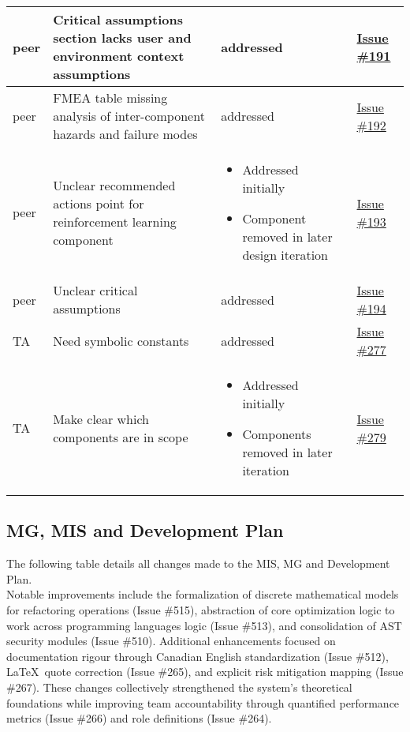 \documentclass{article}
\begin{document}
\begin{longtable}{|p{2cm}|p{3.5cm}|p{4.5cm}|p{3cm}|}
peer & Critical assumptions section lacks user and environment context assumptions & addressed & \href{https://github.com/ssm-lab/capstone--source-code-optimizer/issues/191}{Issue \#191} \\
\hline

peer & FMEA table missing analysis of inter-component hazards and failure modes & addressed & \href{https://github.com/ssm-lab/capstone--source-code-optimizer/issues/192}{Issue \#192} \\
\hline

peer & Unclear recommended actions point for reinforcement learning component & \begin{itemize}[nosep,leftmargin=*]
    \item Addressed initially
    \item Component removed in later design iteration
\end{itemize} & \href{https://github.com/ssm-lab/capstone--source-code-optimizer/issues/193}{Issue \#193} \\
\hline

peer & Unclear critical assumptions & addressed & \href{https://github.com/ssm-lab/capstone--source-code-optimizer/issues/194}{Issue \#194} \\
\hline

TA & Need symbolic constants & addressed & \href{https://github.com/ssm-lab/capstone--source-code-optimizer/issues/277}{Issue \#277} \\
\hline

TA & Make clear which components are in scope & \begin{itemize}[nosep,leftmargin=*]
    \item Addressed initially
    \item Components removed in later iteration
\end{itemize} & \href{https://github.com/ssm-lab/capstone--source-code-optimizer/issues/279}{Issue \#279} \\
\hline
\end{longtable}


\subsection{MG, MIS and Development Plan}

The following table details all changes made to the MIS, MG and Development Plan. \\

\noindent Notable improvements include the formalization of discrete mathematical models for %
refactoring operations (Issue \#515), abstraction of core optimization logic to work across programming languages %
logic (Issue \#513), and consolidation of AST security modules (Issue \#510). %
Additional enhancements focused on documentation rigour through Canadian English %
standardization (Issue \#512), \LaTeX\ quote correction (Issue \#265), and %
explicit risk mitigation mapping (Issue \#267). These changes collectively %
strengthened the system's theoretical foundations while improving team %
accountability through quantified performance metrics (Issue \#266) and %
role definitions (Issue \#264).
\end{document}
